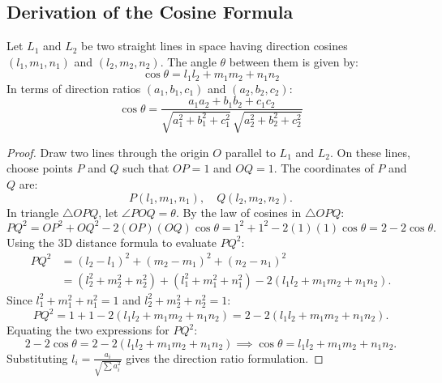 \subsection{Derivation of the Cosine Formula}
\begin{theorembox}
Let $L_1$ and $L_2$ be two straight lines in space having direction cosines $(l_1, m_1, n_1)$ and $(l_2, m_2, n_2)$. The angle $\theta$ between them is given by:
\begin{equation}
    \boxed{\cos\theta = l_1 l_2 + m_1 m_2 + n_1 n_2}
\end{equation}
In terms of direction ratios $(a_1, b_1, c_1)$ and $(a_2, b_2, c_2)$:
\begin{equation}
    \boxed{\cos\theta = \frac{a_1 a_2 + b_1 b_2 + c_1 c_2}{\sqrt{a_1^2 + b_1^2 + c_1^2}\,\sqrt{a_2^2 + b_2^2 + c_2^2}}}
\end{equation}
\end{theorembox}

\begin{proof}
Draw two lines through the origin $O$ parallel to $L_1$ and $L_2$.
On these lines, choose points $P$ and $Q$ such that $OP = 1$ and $OQ = 1$.
The coordinates of $P$ and $Q$ are:
\begin{equation}
    P(l_1, m_1, n_1), \quad Q(l_2, m_2, n_2).
\end{equation}
In triangle $\triangle OPQ$, let $\angle POQ = \theta$.
By the law of cosines in $\triangle OPQ$:
\begin{equation}
    PQ^2 = OP^2 + OQ^2 - 2(OP)(OQ)\cos\theta = 1^2 + 1^2 - 2(1)(1)\cos\theta = 2 - 2\cos\theta.
\end{equation}
Using the 3D distance formula to evaluate $PQ^2$:
\begin{align}
    PQ^2 &= (l_2 - l_1)^2 + (m_2 - m_1)^2 + (n_2 - n_1)^2 \nonumber\\
    &= (l_2^2 + m_2^2 + n_2^2) + (l_1^2 + m_1^2 + n_1^2) - 2(l_1 l_2 + m_1 m_2 + n_1 n_2).
\end{align}
Since $l_1^2+m_1^2+n_1^2 = 1$ and $l_2^2+m_2^2+n_2^2 = 1$:
\begin{equation}
    PQ^2 = 1 + 1 - 2(l_1 l_2 + m_1 m_2 + n_1 n_2) = 2 - 2(l_1 l_2 + m_1 m_2 + n_1 n_2).
\end{equation}
Equating the two expressions for $PQ^2$:
\begin{equation}
    2 - 2\cos\theta = 2 - 2(l_1 l_2 + m_1 m_2 + n_1 n_2) \implies \boxed{\cos\theta = l_1 l_2 + m_1 m_2 + n_1 n_2}.
\end{equation}
Substituting $l_i = \frac{a_i}{\sqrt{\sum a_i^2}}$ gives the direction ratio formulation.
\end{proof}

